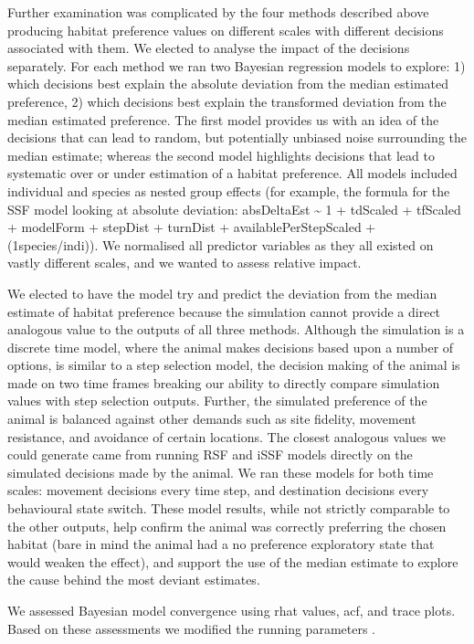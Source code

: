 \documentclass[10pt,a4paper]{article}
\begin{document}
Further examination was complicated by the four methods described above producing habitat preference values on different scales with different decisions associated with them.
We elected to analyse the impact of the decisions separately.
For each method we ran two Bayesian regression models to explore: 1) which decisions best explain the absolute deviation from the median estimated preference, 2) which decisions best explain the transformed deviation from the median estimated preference.
The first model provides us with an idea of the decisions that can lead to random, but potentially unbiased noise surrounding the median estimate; whereas the second model highlights decisions that lead to systematic over or under estimation of a habitat preference.
All models included individual and species as nested group effects (for example, the formula for the SSF model looking at absolute deviation: absDeltaEst \textasciitilde{} 1 + tdScaled + tfScaled + modelForm + stepDist + turnDist + availablePerStepScaled + (1\textbar species/indi)).
We normalised all predictor variables as they all existed on vastly different scales, and we wanted to assess relative impact.

We elected to have the model try and predict the deviation from the median estimate of habitat preference because the simulation cannot provide a direct analogous value to the outputs of all three methods.
Although the simulation is a discrete time model, where the animal makes decisions based upon a number of options, is similar to a step selection model, the decision making of the animal is made on two time frames breaking our ability to directly compare simulation values with step selection outputs.
Further, the simulated preference of the animal is balanced against other demands such as site fidelity, movement resistance, and avoidance of certain locations.
The closest analogous values we could generate came from running RSF and iSSF models directly on the simulated decisions made by the animal.
We ran these models for both time scales: movement decisions every time step, and destination decisions every behavioural state switch.
These model results, while not strictly comparable to the other outputs, help confirm the animal was correctly preferring the chosen habitat (bare in mind the animal had a no preference exploratory state that would weaken the effect), and support the use of the median estimate to explore the cause behind the most deviant estimates.

We assessed Bayesian model convergence using rhat values, acf, and trace plots.
Based on these assessments we modified the running parameters .
\end{document}
